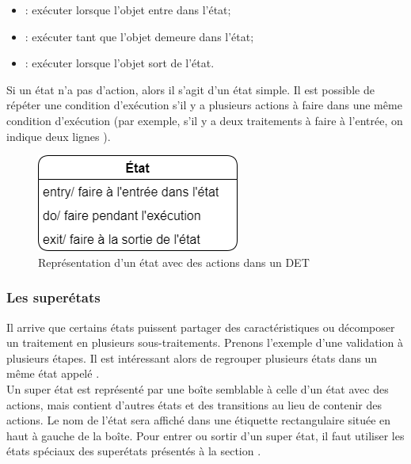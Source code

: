 \begin{itemize}
	\item {} : exécuter lorsque l'objet entre dans l'état;
	\item {} : exécuter tant que l'objet demeure dans l'état;
	\item {} : exécuter lorsque l'objet sort de l'état.
\end{itemize}

Si un état n'a pas d'action, alors il s'agit d'un état simple. Il est possible de répéter une condition d'exécution s'il y a plusieurs actions à faire dans une même condition d'exécution (par exemple, s'il y a deux traitements à faire à l'entrée, on indique deux lignes ).

\begin{figure}[H]
	\caption{Représentation d'un état avec des actions dans un \acrshort{DET}}
	\centering
	\includegraphics[scale=0.4]{etat2.png}
\end{figure}

\subsubsection{Les superétats}

Il arrive que certains états puissent partager des caractéristiques ou décomposer un traitement en plusieurs sous-traitements. Prenons l'exemple d'une validation à plusieurs étapes. Il est intéressant alors de regrouper plusieurs états dans un même état appelé .\\

Un super état est représenté par une boîte semblable à celle d'un état avec des actions, mais contient d'autres états et des transitions au lieu de contenir des actions. Le nom de l'état sera affiché dans une étiquette rectangulaire située en haut à gauche de la boîte. Pour entrer ou sortir d'un super état, il faut utiliser les états spéciaux des superétats présentés à la section .

